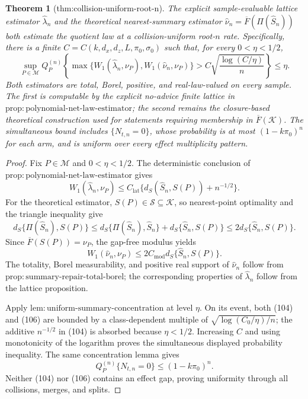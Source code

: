\documentclass{article}
\newtheorem{theorem}{Theorem}
\begin{document}
\begin{theorem}[thm:collision-uniform-root-n]\label{thm:collision-uniform-root-n}
The explicit sample-evaluable lattice estimator \(\widehat\lambda_n\) and the theoretical nearest-summary estimator \(\widehat\nu_n=\overline F(\Pi(\widehat S_n))\) both estimate the quotient law at a collision-uniform root-\(n\) rate.  Specifically, there is a finite \(C=C(k,d_x,d_z,L,\pi_0,\sigma_0)\) such that, for every \(0<\eta<1/2\),
\[
\sup_{P\in\mathcal M}Q_P^{(n)}\!\left\{
\max\{W_1(\widehat\lambda_n,\nu_P),W_1(\widehat\nu_n,\nu_P)\}
>C\sqrt{\frac{\log(C/\eta)}{n}}\right\}\le\eta.
\]
Both estimators are total, Borel, positive, and real-law-valued on every sample.  The first is computable by the explicit no-advice finite lattice in \(\mathrm{prop:polynomial\text{-}net\text{-}law\text{-}estimator}\); the second remains the closure-based theoretical construction used for statements requiring membership in \(\overline F(\mathcal K)\).  The simultaneous bound includes \(\{N_{t,n}=0\}\), whose probability is at most \((1-k\pi_0)^n\) for each arm, and is uniform over every effect multiplicity pattern.
\end{theorem}
\begin{proof}
Fix \(P\in\mathcal M\) and \(0<\eta<1/2\).  The deterministic conclusion of \(\mathrm{prop:polynomial\text{-}net\text{-}law\text{-}estimator}\) gives
\[
W_1(\widehat\lambda_n,\nu_P)
\le C_{\mathrm{lat}}\{d_S(\widehat S_n,S(P))+n^{-1/2}\}.             \tag{104}
\]
For the theoretical estimator, \(S(P)\in\mathscr S\subseteq\mathcal K\), so nearest-point optimality and the triangle inequality give
\[
d_S\{\Pi(\widehat S_n),S(P)\}
\le d_S\{\Pi(\widehat S_n),\widehat S_n\}
+d_S\{\widehat S_n,S(P)\}
\le2d_S\{\widehat S_n,S(P)\}.                                      \tag{105}
\]
Since \(\overline F(S(P))=\nu_P\), the gap-free modulus yields
\[
W_1(\widehat\nu_n,\nu_P)
\le2C_{\mathrm{mod}}d_S\{\widehat S_n,S(P)\}.                       \tag{106}
\]
The totality, Borel measurability, and positive real support of \(\widehat\nu_n\) follow from \(\mathrm{prop:summary\text{-}repair\text{-}total\text{-}borel}\); the corresponding properties of \(\widehat\lambda_n\) follow from the lattice proposition.

Apply \(\mathrm{lem:uniform\text{-}summary\text{-}concentration}\) at level \(\eta\).  On its event, both (104) and (106) are bounded by a class-dependent multiple of \(\sqrt{\log(C_0/\eta)/n}\); the additive \(n^{-1/2}\) in (104) is absorbed because \(\eta<1/2\).  Increasing \(C\) and using monotonicity of the logarithm proves the simultaneous displayed probability inequality.  The same concentration lemma gives
\[
Q_P^{(n)}\{N_{t,n}=0\}\le(1-k\pi_0)^n.
\]
Neither (104) nor (106) contains an effect gap, proving uniformity through all collisions, merges, and splits.
\end{proof}
\end{document}
